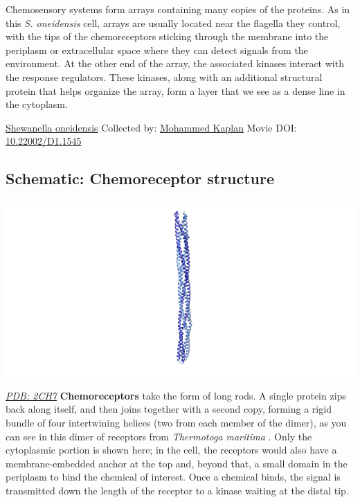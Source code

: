 \documentclass[]{tufte-book}
\begin{document}
Chemosensory systems form arrays containing many copies of the proteins. As in this \emph{S. oneidensis} cell, arrays are usually located near the flagella they control, with the tips of the chemoreceptors sticking through the membrane into the periplasm or extracellular space where they can detect signals from the environment. At the other end of the array, the associated kinases interact with the response regulators. These kinases, along with an additional structural protein that helps organize the array, form a layer that we see as a dense line in the cytoplasm.



\hypertarget{htmlwidget-8d80fef862e49e10bc46}{}

\label{fig:7-1}\protect\hyperlink{tree}{Shewanella oneidensis} Collected by: \protect\hyperlink{mohammed_kaplan}{Mohammed Kaplan} Movie DOI: \href{https://doi.org/10.22002/D1.1545}{10.22002/D1.1545}

\hypertarget{Chemoreceptor_structure}{%
\subsection*{Schematic: Chemoreceptor structure}\label{Chemoreceptor_structure}}

\includegraphics{img/schematics/7_1_1}

\href{http://rcsb.org/structure/2CH7}{\emph{PDB: 2CH7}}
\textbf{Chemoreceptors} take the form of long rods. A single protein zips back along itself, and then joins together with a second copy, forming a rigid bundle of four intertwining helices (two from each member of the dimer), as you can see in this dimer of receptors from \emph{Thermotoga maritima} \citep{park2006}. Only the cytoplasmic portion is shown here; in the cell, the receptors would also have a membrane-embedded anchor at the top and, beyond that, a small domain in the periplasm to bind the chemical of interest. Once a chemical binds, the signal is transmitted down the length of the receptor to a kinase waiting at the distal tip.
\end{document}
